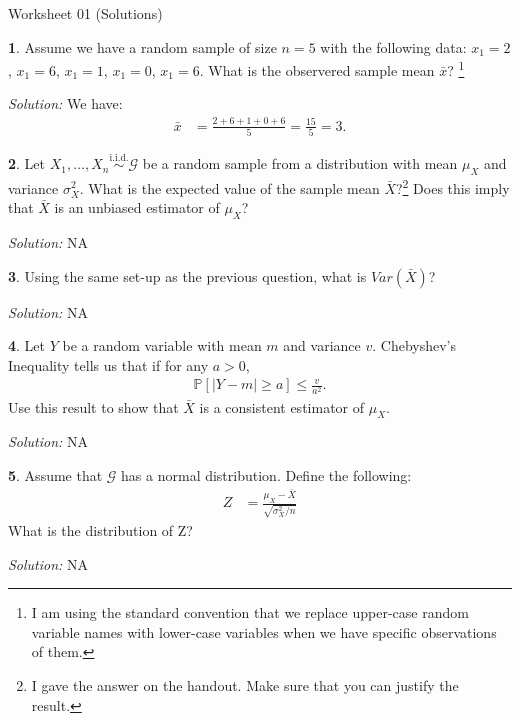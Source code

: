 \documentclass{tufte-handout}
\newcommand{\iid}{\overset{\mathrm{i.i.d.}}{\sim}}
\begin{document}
\justify

{\LARGE Worksheet 01 (Solutions)}

\vspace*{18pt}


\textbf{1}. Assume we have a random sample of size $n = 5$ with the following data:
$x_1 = 2$, $x_1 = 6$, $x_1 = 1$, $x_1 = 0$, $x_1 = 6$. What is the observered
sample mean $\bar{x}$? 
\footnote{
  I am using the standard convention that we replace upper-case random 
  variable names with lower-case variables when we have specific 
  observations of them. 
}

\textit{Solution:} We have:
\begin{align*}
\bar{x} &= \frac{2 + 6 + 1 + 0 + 6}{5} = \frac{15}{5} = 3.
\end{align*}

\textbf{2}. Let $X_1, \ldots, X_n \iid \mathcal{G}$ be a random sample from a distribution
with mean $\mu_X$ and variance $\sigma^2_X$. What is the expected value of the
sample mean $\bar{X}$?\footnote{
  I gave the answer on the handout. Make sure that you can justify
  the result.
} Does this imply that $\bar{X}$ is an unbiased estimator of $\mu_X$?

\textit{Solution:} NA

\textbf{3}. Using the same set-up as the previous question, what is $Var(\bar{X})$?

\textit{Solution:} NA

\textbf{4}. Let $Y$ be a random variable with mean $m$ and variance $v$. Chebyshev's
Inequality tells us that if for any $a > 0$,
\begin{align*}
\mathbb{P}[ |Y - m| \geq a] \leq \frac{v}{a^2}.
\end{align*}
Use this result to show that $\bar{X}$ is a consistent estimator of $\mu_X$.

\textit{Solution:} NA

\textbf{5}. Assume that $\mathcal{G}$ has a normal distribution. Define the following:
\begin{align*}
Z &= \frac{\mu_X - \bar{X}}{\sqrt{\sigma_X^2 / n}}
\end{align*}
What is the distribution of Z?

\textit{Solution:} NA
\end{document}

